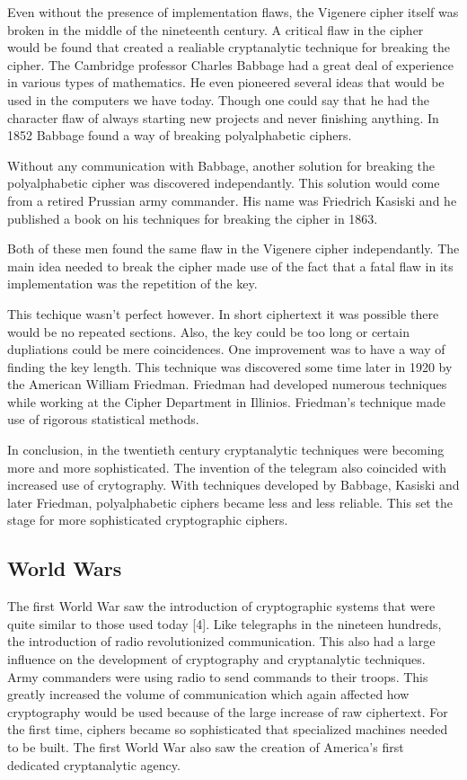 \documentclass{article}
\begin{document}
    Even without the presence of implementation flaws, the Vigenere cipher itself was
    broken in the middle of the nineteenth century. A critical flaw in the cipher
    would be found that created a realiable cryptanalytic technique for breaking
    the cipher.
    The Cambridge professor Charles Babbage had a great deal of
    experience in various types of mathematics. He even pioneered several ideas
    that would be used in the computers we have today. Though one could say that
    he had the character flaw of always starting new projects and never finishing anything.
    In 1852 Babbage found a way of breaking polyalphabetic ciphers.

    Without any communication with Babbage, another solution for breaking the polyalphabetic
    cipher was discovered independantly. This solution would come
    from a retired Prussian army commander. His name was Friedrich Kasiski and he published
    a book on his techniques for breaking the cipher in 1863.

    Both of these men found the same flaw in the Vigenere cipher independantly.
    The main idea needed to break the cipher made use of the fact that a fatal
    flaw in its implementation was the repetition of the key.

    This techique wasn't perfect however. In short ciphertext it was possible there
    would be no repeated sections. Also, the key could be too long or certain dupliations
    could be mere coincidences.
    One improvement was to have a way of finding the key length. This technique was
    discovered some time later in 1920 by the American William Friedman. Friedman had
    developed numerous techniques while working at the Cipher Department in Illinios.
    Friedman's technique made use of rigorous statistical methods.

    In conclusion, in the twentieth century cryptanalytic techniques were becoming
    more and more sophisticated. The invention of the telegram also coincided
    with increased use of crytography. With techniques developed by Babbage,
    Kasiski and later Friedman, polyalphabetic ciphers became less and less reliable.
    This set the stage for more sophisticated cryptographic ciphers.

    \subsection{World Wars}

    The first World War saw the introduction of cryptographic systems that
    were quite similar to those used today [4]. Like telegraphs in the nineteen
    hundreds, the introduction of radio revolutionized communication.
    This also had a large influence on the development of cryptography and cryptanalytic
    techniques. Army commanders were using radio to send commands to their troops.
    This greatly increased the volume of communication which again affected how
    cryptography would be used because of the large increase of raw ciphertext.
    For the first time, ciphers became so sophisticated that specialized machines
    needed to be built. The first World War also saw the creation of America's
    first dedicated cryptanalytic agency.
\end{document}
